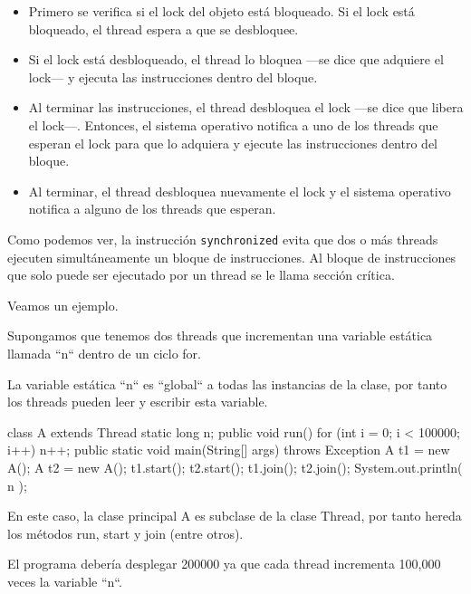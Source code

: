 \documentclass[11pt,a4paper,oneside]{book}
\begin{document}
\begin{itemize}

\item Primero se verifica si el lock del objeto está bloqueado. Si el lock está bloqueado, el thread espera a que se desbloquee.

\item Si el lock está desbloqueado, el thread lo bloquea —se dice que adquiere el lock— y ejecuta las instrucciones dentro del bloque.

\item Al terminar las instrucciones, el thread desbloquea el lock —se dice que libera el lock—. Entonces, el sistema operativo notifica a uno de los threads que esperan el lock para que lo adquiera y ejecute las instrucciones dentro del bloque.

\item Al terminar, el thread desbloquea nuevamente el lock y el sistema operativo notifica a alguno de los threads que esperan.

\end{itemize}

Como podemos ver, la instrucción \texttt{synchronized} evita que dos o más threads ejecuten simultáneamente un bloque de instrucciones. Al bloque de instrucciones que solo puede ser ejecutado por un thread se le llama sección crítica.

Veamos un ejemplo.

Supongamos que tenemos dos threads que incrementan una variable estática llamada ``n`` dentro de un ciclo for.

La variable estática ``n`` es ``global`` a todas las instancias de la clase, por tanto los threads pueden leer y escribir esta variable.

\begin{SourceCode}
class A extends Thread
{
  static long n;
  public void run()
  {
    for (int i = 0; i < 100000; i++)
        n++;
  }
  public static void main(String[] args) throws Exception
  {
    A t1 = new A();
    A t2 = new A();
    t1.start();
    t2.start();
    t1.join();
    t2.join();
    System.out.println( n );
  }
}
\end{SourceCode}

En este caso, la clase principal A es subclase de la clase Thread, por tanto hereda los métodos run, start y join (entre otros).

El programa debería desplegar 200000 ya que cada thread incrementa 100,000 veces la variable ``n``.
\end{document}
